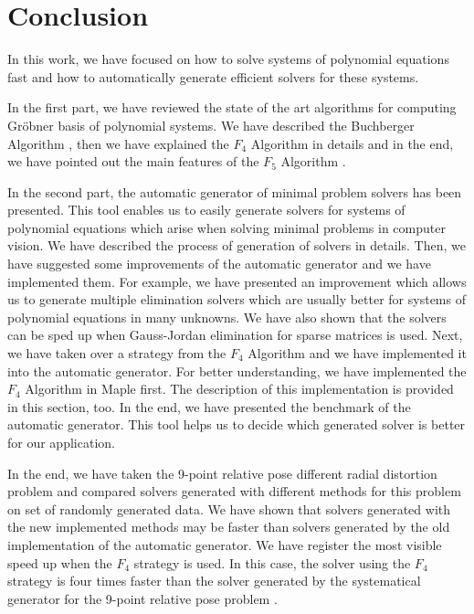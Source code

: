 \chapter{Conclusion}
In this work, we have focused on how to solve systems of polynomial equations fast and how to automatically generate efficient solvers for these systems.

In the first part, we have reviewed the state of the art algorithms for computing Gr\"obner basis of polynomial systems. We have described the Buchberger Algorithm \cite{Buchberger65}, then we have explained the $F_4$ Algorithm \cite{F4} in details and in the end, we have pointed out the main features of the $F_5$ Algorithm \cite{F5}.

In the second part, the automatic generator \cite{AutoGen} of minimal problem solvers has been presented. This tool enables us to easily generate solvers for systems of polynomial equations which arise when solving minimal problems in computer vision. We have described the process of generation of solvers in details. Then, we have suggested some improvements of the automatic generator and we have implemented them. For example, we have presented an improvement which allows us to generate multiple elimination solvers which are usually better for systems of polynomial equations in many unknowns. We have also shown that the solvers can be sped up when Gauss-Jordan elimination for sparse matrices is used. Next, we have taken over a strategy from the $F_4$ Algorithm \cite{F4} and we have implemented it into the automatic generator. For better understanding, we have implemented the $F_4$ Algorithm \cite{F4} in Maple first. The description of this implementation is provided in this section, too. In the end, we have presented the benchmark of the automatic generator. This tool helps us to decide which generated solver is better for our application.

In the end, we have taken the 9-point relative pose different radial distortion problem \cite{9pt} and compared solvers generated with different methods for this problem on set of randomly generated data. We have shown that solvers generated with the new implemented methods may be faster than solvers generated by the old implementation of the automatic generator. We have register the most visible speed up when the $F_4$ strategy is used. In this case, the solver using the $F_4$ strategy is four times faster than the solver generated by the systematical generator for the 9-point relative pose problem \cite{9pt}.
